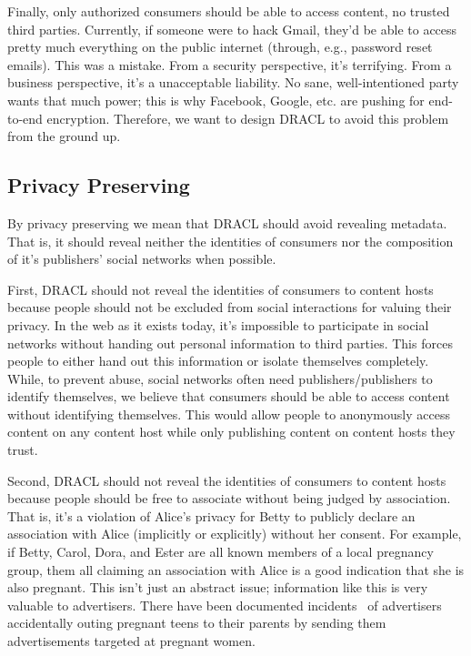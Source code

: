 \documentclass[pdftex,12pt,a4papaer]{report}
\begin{document}
Finally, only authorized consumers should be able to access content, no trusted
third parties. Currently, if someone were to hack Gmail, they'd be able to
access pretty much everything on the public internet (through, e.g., password
reset emails). This was a mistake. From a security perspective, it's terrifying.
From a business perspective, it's a unacceptable liability. No sane,
well-intentioned party wants that much power; this is why Facebook, Google, etc.
are pushing for end-to-end encryption. Therefore, we want to design DRACL to
avoid this problem from the ground up.

\subsection{Privacy Preserving}

By privacy preserving we mean that DRACL should avoid revealing metadata. That
is, it should reveal neither the identities of consumers nor the composition of
it's publishers' social networks when possible.

First, DRACL should not reveal the identities of consumers to content hosts
because people should not be excluded from social interactions for valuing their
privacy. In the web as it exists today, it's impossible to participate in social
networks without handing out personal information to third parties. This forces
people to either hand out this information or isolate themselves completely.
While, to prevent abuse, social networks often need publishers/publishers to
identify themselves, we believe that consumers should be able to access content
without identifying themselves. This would allow people to anonymously access
content on any content host while only publishing content on content hosts they
trust.

Second, DRACL should not reveal the identities of consumers to content hosts
because people should be free to associate without being judged by association.
That is, it's a violation of Alice's privacy for Betty to publicly declare an
association with Alice (implicitly or explicitly) without her consent. For
example, if Betty, Carol, Dora, and Ester are all known members of a local
pregnancy group, them all claiming an association with Alice is a good
indication that she is also pregnant. This isn't just an abstract issue;
information like this is very valuable to advertisers. There have been
documented incidents~\cite{target} of advertisers accidentally outing pregnant
teens to their parents by sending them advertisements targeted at pregnant
women.
\end{document}
